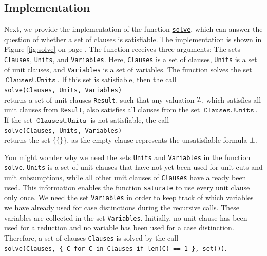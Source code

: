 \subsection{Implementation}
Next, we provide the implementation of the function 
\href{https://github.com/karlstroetmann/Logic/blob/master/SetlX/davis-putnam.stlx}{\texttt{solve}}, 
which can answer the question of whether a set of clauses is satisfiable. The
implementation is shown in Figure \ref{fig:solve} on page \pageref{fig:solve}.
The function receives three arguments: The sets \texttt{Clauses}, \texttt{Units}, and \texttt{Variables}.
Here, \texttt{Clauses} is a set of clauses, \texttt{Units} is a set of unit clauses, and \texttt{Variables} is
a set of variables.  The function solves the set $\texttt{Clauses} \cup \texttt{Units}$.  If this set is
satisfiable, then the call
\\[0.2cm]
\hspace*{1.3cm}
\texttt{solve(Clauses, Units, Variables)} 
\\[0.2cm]
returns a set of unit clauses \texttt{Result}, such
that any valuation $\mathcal{I}$, which satisfies all unit clauses from \texttt{Result}, also satisfies all clauses from
the set $\texttt{Clauses} \cup \texttt{Units}$. If the set $\texttt{Clauses} \cup \texttt{Units}$ is not
satisfiable, the call
\\[0.2cm]
\hspace*{1.3cm}
\texttt{solve(Clauses, Units, Variables)}
\\[0.2cm]
returns the set $\bigl\{ \{\} \bigr\}$, as the empty clause represents the unsatisfiable formula $\bot$.

You might wonder why we need the sets \texttt{Units} and \texttt{Variables} in the function \texttt{solve}.
\texttt{Units} is a set of unit clauses that have not yet been used for unit cuts and unit subsumptions, while
all other unit clauses of \texttt{Clauses} have already been used.  This information enables the function
\texttt{saturate} to use every unit clause only once.  We need the set \texttt{Variables} in order to keep
track of which variables we have already used for case distinctions during the recursive calls. These
variables are collected in the set \texttt{Variables}.  Initially, no unit clause has been used for a
reduction and no variable has been used for a case distinction.  Therefore, a set of clauses \texttt{Clauses}
is solved by the call
\\[0.2cm]
\hspace*{1.3cm}
\texttt{solve(Clauses, \{ C for C in Clauses if len(C) == 1 \}, set())}.
\\[0.2cm]\mbox{}

